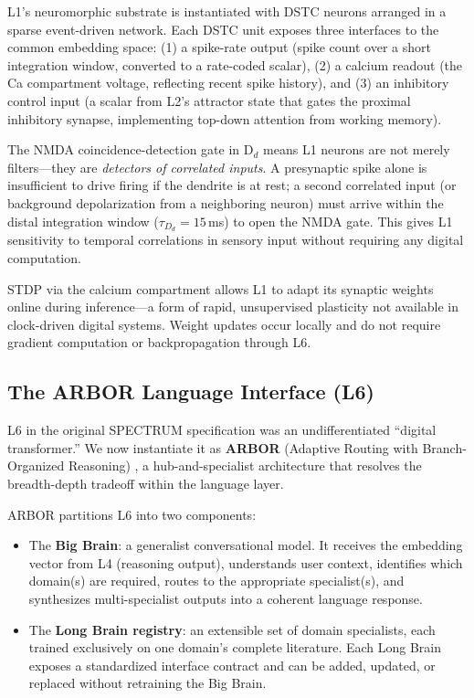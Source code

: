 \documentclass[12pt]{article}
\begin{document}
L1's neuromorphic substrate is instantiated with DSTC neurons arranged in a sparse event-driven network. Each DSTC unit exposes three interfaces to the common embedding space: (1) a spike-rate output (spike count over a short integration window, converted to a rate-coded scalar), (2) a calcium readout (the Ca compartment voltage, reflecting recent spike history), and (3) an inhibitory control input (a scalar from L2's attractor state that gates the proximal inhibitory synapse, implementing top-down attention from working memory).

The NMDA coincidence-detection gate in D$_d$ means L1 neurons are not merely filters---they are \emph{detectors of correlated inputs}. A presynaptic spike alone is insufficient to drive firing if the dendrite is at rest; a second correlated input (or background depolarization from a neighboring neuron) must arrive within the distal integration window ($\tau_{D_d} = 15$\,ms) to open the NMDA gate. This gives L1 sensitivity to temporal correlations in sensory input without requiring any digital computation.

STDP via the calcium compartment allows L1 to adapt its synaptic weights online during inference---a form of rapid, unsupervised plasticity not available in clock-driven digital systems. Weight updates occur locally and do not require gradient computation or backpropagation through L6.

\subsection{The ARBOR Language Interface (L6)}
\label{sec:arbor}

L6 in the original SPECTRUM specification was an undifferentiated ``digital transformer.'' We now instantiate it as \textbf{ARBOR} (Adaptive Routing with Branch-Organized Reasoning) \cite{lin2026arbor}, a hub-and-specialist architecture that resolves the breadth-depth tradeoff within the language layer.

ARBOR partitions L6 into two components:

\begin{itemize}
    \item The \textbf{Big Brain}: a generalist conversational model. It receives the embedding vector from L4 (reasoning output), understands user context, identifies which domain(s) are required, routes to the appropriate specialist(s), and synthesizes multi-specialist outputs into a coherent language response.
    \item The \textbf{Long Brain registry}: an extensible set of domain specialists, each trained exclusively on one domain's complete literature. Each Long Brain exposes a standardized interface contract and can be added, updated, or replaced without retraining the Big Brain.
\end{itemize}
\end{document}
